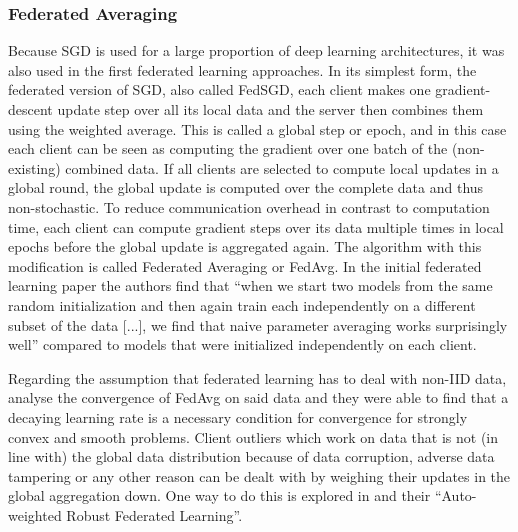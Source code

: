 \subsubsection{Federated Averaging}
Because SGD is used for a large proportion of deep learning architectures, it was also used in the first federated learning approaches. In its simplest form, the federated version of SGD, also called FedSGD, each client makes one gradient-descent update step over all its local data and the server then combines them using the weighted average. This is called a global step or epoch, and in this case each client can be seen as computing the gradient over one batch of the (non-existing) combined data. If all clients are selected to compute local updates in a global round, the global update is computed over the complete data and thus non-stochastic.
To reduce communication overhead in contrast to computation time, each client can compute gradient steps over its data multiple times in local epochs before the global update is aggregated again. The algorithm with this modification is called Federated Averaging or FedAvg. In the initial federated learning paper the authors find that \enquote{when we start two models from the same random initialization and then again train each independently on a different subset of the data [...], we find that naive parameter averaging works surprisingly well}\cite{fl_paper} compared to models that were initialized independently on each client.

Regarding the assumption that federated learning has to deal with non-IID data, \cite{fedavg_convergence} analyse the convergence of FedAvg on said data and they were able to find that a decaying learning rate is a necessary condition for convergence for strongly convex and smooth problems. Client outliers which work on data that is not (in line with) the global data distribution because of data corruption, adverse data tampering or any other reason can be dealt with by weighing their updates in the global aggregation down. One way to do this is explored in \cite{robust_fl} and their \enquote{Auto-weighted Robust Federated Learning}.

